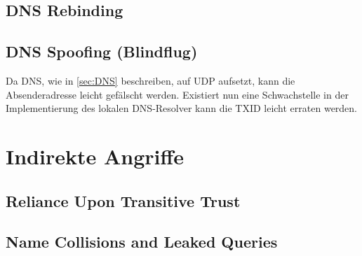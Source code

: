 \subsection{DNS Rebinding}


\subsection{DNS Spoofing (Blindflug)} %
Da DNS, wie in \ref{sec:DNS} beschreiben, auf UDP aufsetzt, kann die Absenderadresse leicht gefälscht werden. Existiert nun eine Schwachstelle in der Implementierung des lokalen DNS-Resolver kann die TXID leicht erraten werden. 

\section{Indirekte Angriffe}

\subsection{Reliance Upon Transitive Trust}


\subsection{Name Collisions and Leaked Queries} 

